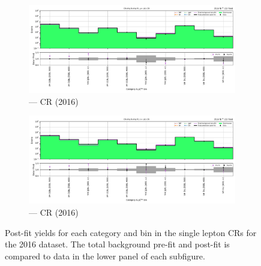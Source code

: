 \begin{figure}[htbp]
    \centering
    \begin{subfigure}[b]{\textwidth}
        \includegraphics[width=\textwidth]{chapters/higgstoinv/figures/mountain_ranges/2016/VH/Wmunu_tree_fit_b-abs_values_VH_cats.pdf}
        \caption{\VH --- \singleMuCr \gls{CR} (2016)}
    \end{subfigure}

    \begin{subfigure}[b]{\textwidth}
        \includegraphics[width=\textwidth]{chapters/higgstoinv/figures/mountain_ranges/2016/VH/Wenu_tree_fit_b-abs_values_VH_cats.pdf}
        \caption{\VH --- \singleEleCr \gls{CR} (2016)}
    \end{subfigure}
    \caption[Post-fit yields for each \VH category and \ptmiss bin in the single lepton control regions for the 2016 dataset]{Post-fit yields for each \VH category and \ptmiss bin in the single lepton \glspl{CR} for the 2016 dataset. The total background pre-fit and post-fit is compared to data in the lower panel of each subfigure.}
    \label{fig:htoinv_mountain_range_VH_2016_single_lep_CRs}
\end{figure}

